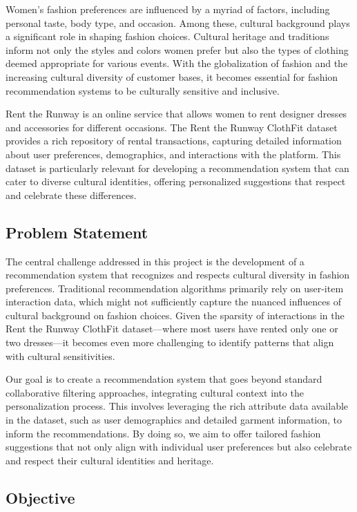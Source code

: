 \documentclass[conference]{IEEEtran}
\begin{document}
Women's fashion preferences are influenced by a myriad of factors, including personal taste, body type, and occasion. Among these, cultural background plays a significant role in shaping fashion choices. Cultural heritage and traditions inform not only the styles and colors women prefer but also the types of clothing deemed appropriate for various events. With the globalization of fashion and the increasing cultural diversity of customer bases, it becomes essential for fashion recommendation systems to be culturally sensitive and inclusive.

Rent the Runway is an online service that allows women to rent designer dresses and accessories for different occasions. The Rent the Runway ClothFit dataset provides a rich repository of rental transactions, capturing detailed information about user preferences, demographics, and interactions with the platform. This dataset is particularly relevant for developing a recommendation system that can cater to diverse cultural identities, offering personalized suggestions that respect and celebrate these differences.

\subsection{Problem Statement}

The central challenge addressed in this project is the development of a recommendation system that recognizes and respects cultural diversity in fashion preferences. Traditional recommendation algorithms primarily rely on user-item interaction data, which might not sufficiently capture the nuanced influences of cultural background on fashion choices. Given the sparsity of interactions in the Rent the Runway ClothFit dataset—where most users have rented only one or two dresses—it becomes even more challenging to identify patterns that align with cultural sensitivities.

Our goal is to create a recommendation system that goes beyond standard collaborative filtering approaches, integrating cultural context into the personalization process. This involves leveraging the rich attribute data available in the dataset, such as user demographics and detailed garment information, to inform the recommendations. By doing so, we aim to offer tailored fashion suggestions that not only align with individual user preferences but also celebrate and respect their cultural identities and heritage.

\subsection{Objective}
\end{document}
